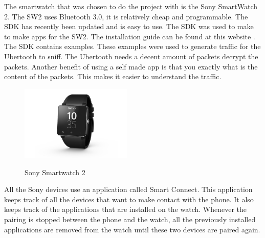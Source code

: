 \label{subsec:sw2}
The smartwatch that was chosen to do the project with is the Sony SmartWatch 2. The SW2 uses Bluetooth 3.0, it is relatively cheap and programmable. The SDK has recently been updated and is easy to use. The SDK was used to make to make apps for the SW2. The installation guide can be found at this website \cite{sw2getstarted}. The SDK contains examples. These examples were used to generate traffic for the Ubertooth to sniff. The Ubertooth needs a decent amount of packets decrypt the packets. Another benefit of using a self made app is that you exactly what is the content of the packets. This makes it easier to understand the traffic.
\begin{figure}[!h]
  \begin{center}
	\includegraphics[width=200px]{images/sw2.jpg}
	\label{fig:sw2}
	\caption{Sony Smartwatch 2}
  \end{center}
\end{figure}
\newpage
All the Sony devices use an application called Smart Connect. This application keeps track of all the devices that want to make contact with the phone. It also keeps track of the applications that are installed on the watch. Whenever the pairing is stopped between the phone and the watch, all the previously installed applications are removed from the watch until these two devices are paired again.

